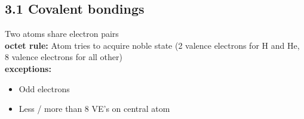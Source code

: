\subsection{3.1 Covalent bondings}
    Two atoms share electron pairs\\
    \textbf{octet rule:} Atom tries to acquire noble state (2 valence electrons for H and He, 8 valence electrons for all other)\\
    \textbf{exceptions:} 
    \begin{itemize}
        \itemsep0em
        \item Odd electrons
        \item Less / more than 8 VE's on central atom
    \end{itemize}